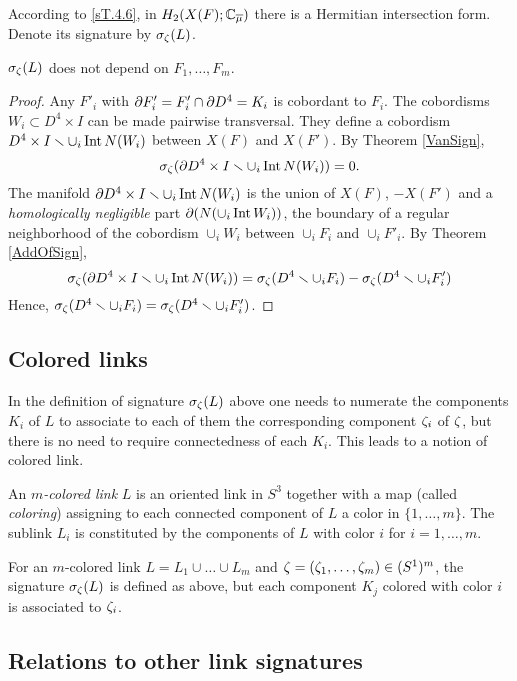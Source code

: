 \documentclass{article}
\numberwithin{equation}{section}
\begin{document}
According to \ref{sT.4.6},
in $H_2(X(F);\mathbb C_{\overline\mu})$ there is a
Hermitian intersection form. Denote its signature by $\sigma_{\zeta}(L)$.

\begin{Th}  $\sigma_{\zeta}(L)$ 
does not depend on $F_1,\dots,F_m$.
\end{Th}

\begin{proof} Any $F'_i$ with $\partial F'_i=F'_i\cap\partial
D^4=K_i$ is cobordant to $F_i$.
The cobordisms $W_i\subset D^4\times I$ can be made 
pairwise transversal.
They define a cobordism $D^4\times I\smallsetminus\cup_i\operatorname{Int} N(W_i)$
between $X(F)$ and
$X(F')$.
By Theorem \ref{VanSign},  
$$\sigma_\zeta(\partial D^4\times I\smallsetminus\cup_i\operatorname{Int} N(W_i))=0.$$
The manifold $\partial D^4\times I\smallsetminus\cup_i\operatorname{Int} N(W_i)$ is the union of
$X(F)$, $-X(F')$ and a {\it
homologically negligible\/} part 
$\partial (N(\cup_i\operatorname{Int} W_i))$, 
the boundary of a regular neighborhood
of the cobordism $\cup_iW_i$ between $\cup_iF_i$ and $\cup_iF'_i$.
By Theorem \ref{AddOfSign}, 
$$\sigma_\zeta(\partial D^4\times I\smallsetminus\cup_i\operatorname{Int}
N(W_i))=\sigma_\zeta(D^4\smallsetminus\cup_iF_i)-\sigma_\zeta(D^4\smallsetminus\cup_iF'_i)$$
Hence, 
$\sigma_\zeta(D^4\smallsetminus\cup_iF_i)=\sigma_\zeta(D^4\smallsetminus\cup_iF'_i)$.
\end{proof}

\subsection{Colored links}\label{s2.4}  In the definition of signature 
$\sigma_{\zeta}(L)$ above one needs to numerate the components $K_i$ of $L$
to associate to each of them the corresponding component $\zeta_i$ of $\zeta$,
but there is no need to require connectedness of each $K_i$. 
This leads to a notion of colored link.  

 An {\sl $m$-colored link} $L$ is an oriented 
link in $S^3$ together with a map (called {\sl coloring\/}) assigning 
to each connected component of $L$ a color in $\{1,\dots, m\}$. 
The sublink $L_i$ is constituted by the components of $L$ with color $i$ 
for $i=1,\dots, m$.

For an $m$-colored link $L=L_1\cup\dots\cup L_m$ and 
$\zeta=(\zeta_1,\dots,\zeta_m)\in (S^1)^m$, the signature $\sigma_\zeta(L)$ is
defined as above, but each component $K_j$ colored with color $i$ is 
associated to $\zeta_i$.   

\subsection{Relations to other link signatures}\label{s2.5}
\end{document}
